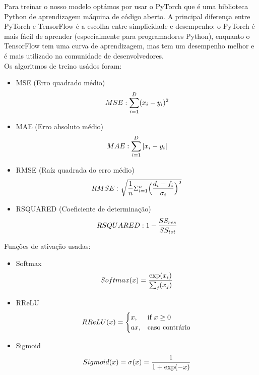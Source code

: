 \documentclass[10pt]{article}
\begin{document}
Para treinar o nosso modelo optámos por usar o PyTorch que é uma biblioteca Python de aprendizagem máquina de código aberto.
A principal diferença entre PyTorch e TensorFlow é a escolha entre simplicidade e desempenho: o PyTorch é mais fácil de aprender
(especialmente para programadores Python), enquanto o TensorFlow tem uma curva de aprendizagem, mas tem um desempenho melhor e é mais utilizado na comunidade de desenvolvedores.
\vspace{1cm}
\\Os algoritmos de treino usádos foram: 
\vspace{1cm}
\begin{itemize}
\item MSE (Erro quadrado médio)
\vspace{1cm}
\begin{equation}
  \vspace{1cm}
  MSE : \sum_{i=1}^{D}(x_i-y_i)^2
\end{equation}
\item MAE (Erro absoluto médio)
\vspace{1cm}
\begin{equation}
  \vspace{1cm}
  MAE : \sum_{i=1}^{D}|x_i-y_i|
\end{equation}
\item RMSE (Raíz quadrada do erro médio)
\vspace{1cm}
\begin{equation}
  \vspace{1cm}
  RMSE : \sqrt{\frac{1}{n}\Sigma_{i=1}^{n}{\Big(\frac{d_i -f_i}{\sigma_i}\Big)^2}}
\end{equation}
\item RSQUARED (Coeficiente de determinação)
\vspace{1cm}
\begin{equation}
  \vspace{1cm}
  RSQUARED : 1 - \frac{SS_{res}}{SS_{tot}}
\end{equation}
\newpage
\end{itemize}
Funções de ativação usadas:
\vspace{1cm}
\begin{itemize}
  \item Softmax
  \begin{equation}
  \vspace{1cm}
  Softmax(x) = \frac{\exp(x_i)}{\sum_j(x_j)}
  \end{equation}
  
  \item RReLU
  \begin{equation}
    \vspace{1cm}
    RReLU(x) =
      \begin{cases}
            x, & \mbox{if } x \geq \mbox{0} \\
            ax, & \mbox{caso contrário}
      \end{cases}
  \end{equation}
  \item Sigmoid
  \begin{equation}
    \vspace{1cm}
    Sigmoid(x) =  \sigma(x) = \frac{1}{1+\exp(-x)}
  \end{equation}
\end{itemize}
\end{document}
